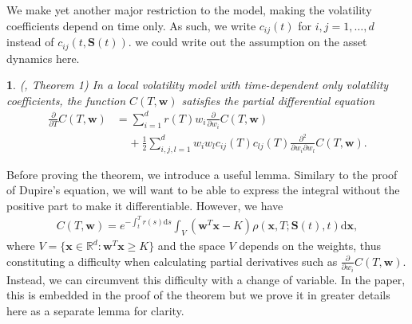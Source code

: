 \documentclass[english]{article}
\newcommand{\comment}[1]{\color{blue}#1\color{black}}
\numberwithin{equation}{section}
\numberwithin{figure}{section}
\theoremstyle{bolddescit}
\newtheorem{theorem}{\protect\theoremname}[section]
\theoremstyle{definition}
\theoremstyle{definition}
\theoremstyle{plain}
\theoremstyle{plain}
\theoremstyle{bolddesc}
\theoremstyle{plain}
\theoremstyle{remark}
\providecommand{\theoremname}{Theorem}
\begin{document}
We make yet another major restriction to the model, making the volatility coefficients depend on time only. As such, we write $c_{ij}(t)$ for $i,j=1,\ldots,d$ instead of $c_{ij}(t,\mathbf{S}(t))$. %
\comment{we could write out the assumption on the asset dynamics here.}

\begin{theorem}\label{thm:generalisation}
  (\cite{pablo_amster_towards_2009}, Theorem 1)
  In a local volatility model with time-dependent only volatility coefficients, the function $C(T,\mathbf{w})$ satisfies the partial differential equation
  \begin{align*}
      \frac{\partial}{\partial T} C(T,\mathbf{w})
      &= \sum_{i=1}^{d} r(T) w_i \frac{\partial}{\partial w_i} C(T,\mathbf{w})\\
      &\ \ \ \ \ + \frac{1}{2} \sum_{i,j,l=1}^{d} w_i w_l c_{ij}(T) c_{lj}(T) \frac{\partial^2}{\partial w_i \partial w_l} C(T,\mathbf{w}).
  \end{align*}
\end{theorem}

Before proving the theorem, we introduce a useful lemma. Similary to the proof of Dupire's equation, we will want to be able to express the integral without the positive part to make it differentiable. However, we have
\begin{align}\label{eq:generalisation-int-over-V}
  C(T,\mathbf{w}) = e^{-\int_t^T r(s) \mathrm{d}s} \int_V (\mathbf{w}^T\mathbf{x} - K) \rho(\mathbf{x},T;\mathbf{S}(t),t) \mathrm{d}\mathbf{x},
\end{align}
where $V = \{ \mathbf{x} \in \mathbb{R}^d : \mathbf{w}^T \mathbf{x} \ge K \}$ and the space $V$ depends on the weights, thus constituting a difficulty when calculating partial derivatives such as $\frac{\partial}{\partial w_i}C(T,\mathbf{w})$. Instead, we can circumvent this difficulty with a change of variable. In the paper, this is embedded in the proof of the theorem but we prove it in greater details here as a separate lemma for clarity.
\end{document}
